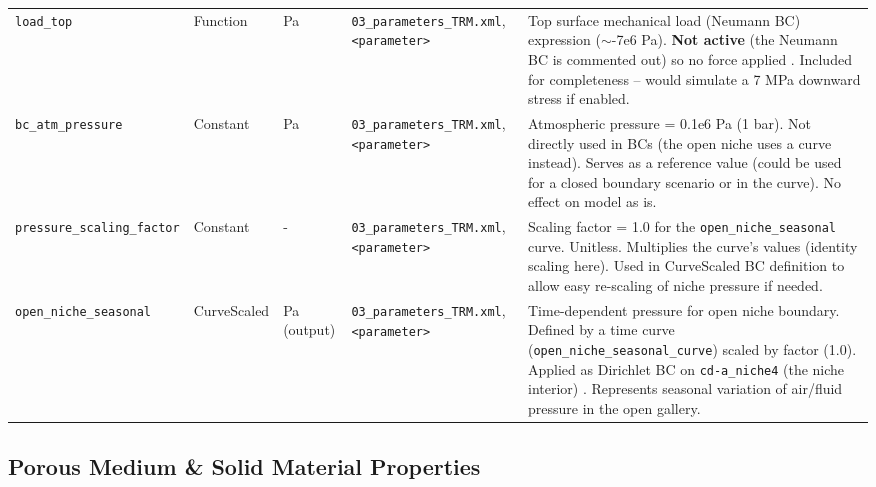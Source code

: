 \documentclass[10pt,a4paper]{article}
\begin{document}
\begin{longtable}{P{4cm} P{1.9cm} P{0.9cm} P{4cm} P{6cm}}
\texttt{load\_top} & Function & Pa & \texttt{03\_parameters\_TRM.xml}, \texttt{<parameter>} \cite{file:03_parameters_TRM} & Top surface mechanical load (Neumann BC) expression ($\sim$-7e6 Pa). \textbf{Not active} (the Neumann BC is commented out) so no force applied \cite{file:02_process_variables_TRM}. Included for completeness – would simulate a 7 MPa downward stress if enabled. \\
\texttt{bc\_atm\_pressure} & Constant & Pa & \texttt{03\_parameters\_TRM.xml}, \texttt{<parameter>} \cite{file:03_parameters_TRM} & Atmospheric pressure = 0.1e6 Pa (1 bar). Not directly used in BCs (the open niche uses a curve instead). Serves as a reference value (could be used for a closed boundary scenario or in the curve). No effect on model as is. \\
\texttt{pressure\_scaling\_factor} & Constant & - & \texttt{03\_parameters\_TRM.xml}, \texttt{<parameter>} \cite{file:03_parameters_TRM} & Scaling factor = 1.0 for the \texttt{open\_niche\_seasonal} curve. Unitless. Multiplies the curve's values (identity scaling here). Used in CurveScaled BC definition \cite{file:03_parameters_TRM} to allow easy re-scaling of niche pressure if needed. \\
\texttt{open\_niche\_seasonal} & CurveScaled & Pa (output) & \texttt{03\_parameters\_TRM.xml}, \texttt{<parameter>} \cite{file:03_parameters_TRM} & Time-dependent pressure for open niche boundary. Defined by a time curve (\texttt{open\_niche\_seasonal\_curve}) scaled by factor (1.0). Applied as Dirichlet BC on \texttt{cd-a\_niche4} (the niche interior) \cite{file:02_process_variables_TRM}. Represents seasonal variation of air/fluid pressure in the open gallery. \\
\end{longtable}


\subsection*{Porous Medium \& Solid Material Properties}
\end{document}
